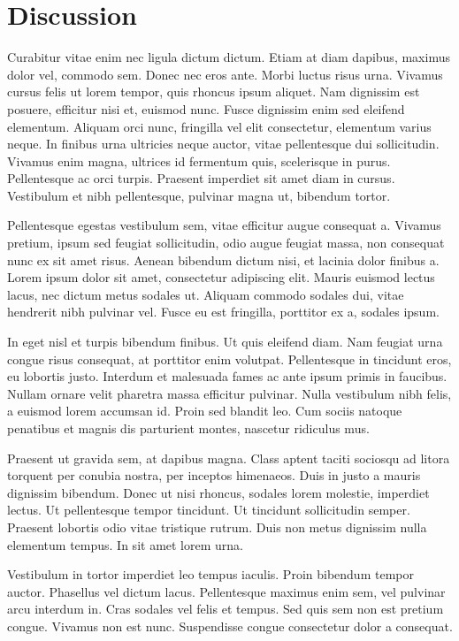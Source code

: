 \documentclass[]{aastex62}
\begin{document}
\section{Discussion} \label{sec:discussion}

Curabitur vitae enim nec ligula dictum dictum. Etiam at diam dapibus, maximus dolor vel, commodo sem. Donec nec eros ante. Morbi luctus risus urna. Vivamus cursus felis ut lorem tempor, quis rhoncus ipsum aliquet. Nam dignissim est posuere, efficitur nisi et, euismod nunc. Fusce dignissim enim sed eleifend elementum. Aliquam orci nunc, fringilla vel elit consectetur, elementum varius neque. In finibus urna ultricies neque auctor, vitae pellentesque dui sollicitudin. Vivamus enim magna, ultrices id fermentum quis, scelerisque in purus. Pellentesque ac orci turpis. Praesent imperdiet sit amet diam in cursus. Vestibulum et nibh pellentesque, pulvinar magna ut, bibendum tortor.

Pellentesque egestas vestibulum sem, vitae efficitur augue consequat a. Vivamus pretium, ipsum sed feugiat sollicitudin, odio augue feugiat massa, non consequat nunc ex sit amet risus. Aenean bibendum dictum nisi, et lacinia dolor finibus a. Lorem ipsum dolor sit amet, consectetur adipiscing elit. Mauris euismod lectus lacus, nec dictum metus sodales ut. Aliquam commodo sodales dui, vitae hendrerit nibh pulvinar vel. Fusce eu est fringilla, porttitor ex a, sodales ipsum.

In eget nisl et turpis bibendum finibus. Ut quis eleifend diam. Nam feugiat urna congue risus consequat, at porttitor enim volutpat. Pellentesque in tincidunt eros, eu lobortis justo. Interdum et malesuada fames ac ante ipsum primis in faucibus. Nullam ornare velit pharetra massa efficitur pulvinar. Nulla vestibulum nibh felis, a euismod lorem accumsan id. Proin sed blandit leo. Cum sociis natoque penatibus et magnis dis parturient montes, nascetur ridiculus mus.

Praesent ut gravida sem, at dapibus magna. Class aptent taciti sociosqu ad litora torquent per conubia nostra, per inceptos himenaeos. Duis in justo a mauris dignissim bibendum. Donec ut nisi rhoncus, sodales lorem molestie, imperdiet lectus. Ut pellentesque tempor tincidunt. Ut tincidunt sollicitudin semper. Praesent lobortis odio vitae tristique rutrum. Duis non metus dignissim nulla elementum tempus. In sit amet lorem urna.

\acknowledgments

Vestibulum in tortor imperdiet leo tempus iaculis. Proin bibendum tempor auctor. Phasellus vel dictum lacus. Pellentesque maximus enim sem, vel pulvinar arcu interdum in. Cras sodales vel felis et tempus. Sed quis sem non est pretium congue. Vivamus non est nunc. Suspendisse congue consectetur dolor a consequat.

\vspace{5mm}



%


\end{document}
